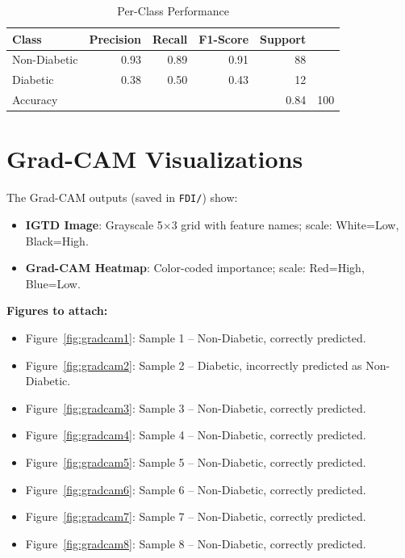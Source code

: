 \documentclass[12pt]{dalthesis}
\begin{document}
\begin{table}[H]
\centering
\caption{Per-Class Performance}
\begin{tabular}{@{}lrrrrr@{}}
\toprule
\textbf{Class} & \textbf{Precision} & \textbf{Recall} & \textbf{F1-Score} & \textbf{Support} \\
\midrule
Non-Diabetic & 0.93 & 0.89 & 0.91 & 88 \\
Diabetic    & 0.38 & 0.50 & 0.43 & 12 \\
\midrule
Accuracy    & \multicolumn{4}{r}{0.84} & 100 \\
\bottomrule
\end{tabular}
\end{table}

\section{Grad-CAM Visualizations}

The Grad-CAM outputs (saved in \texttt{FDI/}) show:
\begin{itemize}
\item \textbf{IGTD Image}: Grayscale 5$\times$3 grid with feature names; scale: White=Low, Black=High.
\item \textbf{Grad-CAM Heatmap}: Color-coded importance; scale: Red=High, Blue=Low.
\end{itemize}

\textbf{Figures to attach:}
\begin{itemize}
\item Figure~\ref{fig:gradcam1}: Sample 1 -- Non-Diabetic, correctly predicted.
\item Figure~\ref{fig:gradcam2}: Sample 2 -- Diabetic, incorrectly predicted as Non-Diabetic.
\item Figure~\ref{fig:gradcam3}: Sample 3 -- Non-Diabetic, correctly predicted.
\item Figure~\ref{fig:gradcam4}: Sample 4 -- Non-Diabetic, correctly predicted.
\item Figure~\ref{fig:gradcam5}: Sample 5 -- Non-Diabetic, correctly predicted.
\item Figure~\ref{fig:gradcam6}: Sample 6 -- Non-Diabetic, correctly predicted.
\item Figure~\ref{fig:gradcam7}: Sample 7 -- Non-Diabetic, correctly predicted.
\item Figure~\ref{fig:gradcam8}: Sample 8 -- Non-Diabetic, correctly predicted.
\end{itemize}
\end{document}
